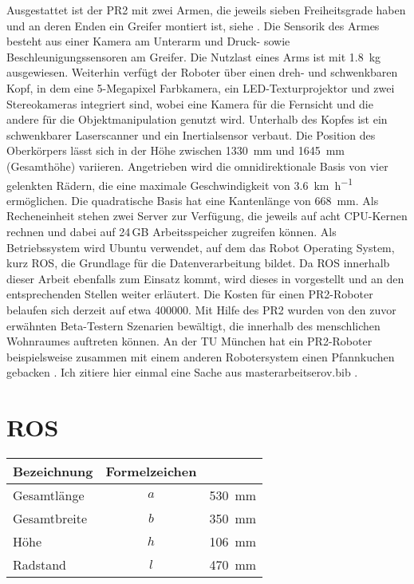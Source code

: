 Ausgestattet ist der PR2 mit zwei Armen, die jeweils sieben Freiheitsgrade haben und an deren Enden ein Greifer montiert ist, siehe . Die Sensorik des Armes besteht aus einer Kamera am Unterarm und Druck- sowie Beschleunigungssensoren am Greifer. Die Nutzlast eines Arms ist mit \SI{1,8}{kg} ausgewiesen. Weiterhin verfügt der Roboter über einen dreh- und schwenkbaren Kopf, in dem eine 5-Megapixel Farbkamera, ein LED-Texturprojektor und zwei Stereokameras integriert sind, wobei eine Kamera für die Fernsicht und die andere für die Objektmanipulation genutzt wird. Unterhalb des Kopfes ist ein schwenkbarer Laserscanner und ein Inertialsensor verbaut. Die Position des Oberkörpers lässt sich in der Höhe zwischen \SI{1330}{mm} und \SI{1645}{mm} (Gesamthöhe) variieren. Angetrieben wird die omnidirektionale Basis von vier gelenkten Rädern, die eine maximale Geschwindigkeit von \SI{3,6}{\kilo\metre\per\hour} ermöglichen. Die quadratische Basis hat eine Kantenlänge von \SI{668}{mm}. Als Recheneinheit stehen zwei Server zur Verfügung, die jeweils auf acht CPU-Kernen rechnen und dabei auf 24\,GB Arbeitsspeicher zugreifen können. Als Betriebssystem wird Ubuntu verwendet, auf dem das Robot Operating System, kurz ROS, die Grundlage für die Datenverarbeitung bildet. Da ROS innerhalb dieser Arbeit ebenfalls zum Einsatz kommt, wird dieses in  vorgestellt und an den entsprechenden Stellen weiter erläutert. Die Kosten für einen PR2-Roboter belaufen sich derzeit auf etwa \SI{400 000}{}\footnotemark. Mit Hilfe des PR2 wurden von den zuvor erwähnten Beta-Testern Szenarien bewältigt, die innerhalb des menschlichen Wohnraumes auftreten können. An der TU München hat ein PR2-Roboter beispielsweise zusammen mit einem anderen Robotersystem einen Pfannkuchen gebacken \cite{TUM2011}.
Ich zitiere hier einmal eine Sache aus masterarbeitserov.bib \cite{Li2017}.

\section{ROS}
\label{sec.ROS}

\begin{table}[ht]
	\centering
	\caption{Technische Daten der youBot Plattform}\label{tab.TechSpecYouBotBase}
	\vspace*{-3mm}
	\begin{longtable}[ht]{|l|c|r|}\hline
		\rowcolor{Snow2}
		Bezeichnung						& Formelzeichen	& \\ \hline
		Gesamtlänge 					&$a$& \SI{530}{mm}				\\ \hline
		Gesamtbreite 					&$b$& \SI{350}{mm}				\\ \hline
		Höhe									&$h$& \SI{106}{mm}				\\ \hline
		Radstand							&$l$& \SI{470}{mm}				\\
		\hline
	\end{longtable} 
	\vspace*{-3mm}
\end{table}


